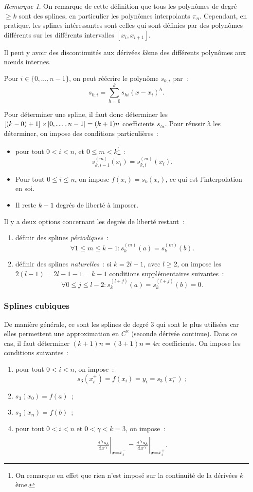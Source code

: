\documentclass{article}
\theoremstyle{definition}
\theoremstyle{remark}
\newtheorem*{rmq}{Remarque}
\begin{document}
		\begin{rmq} On remarque de cette définition que tous les polynômes de degré $\geq k$ sont des splines, en particulier les polynômes interpolants $\pi_n$.
		Cependant, en pratique, les splines intéressantes sont celles qui sont définies par des polynômes différents sur les différents intervalles
		$[x_i, x_{i+1}]$.

		Il peut y avoir des discontinuités aux dérivées $k$ème des différents polynômes aux nœuds internes.
		\end{rmq}

		Pour $i \in \{0, \dotsc, n-1\}$, on peut réécrire le polynôme $s_{k,i}$ par~:
		\[s_{k, i} = \sum_{h=0}^ks_{hi}(x-x_i)^h.\]

		Pour déterminer une spline, il faut donc déterminer les $[(k-0)+1] \times \abs{0, \dotsc, n-1} = (k+1)n$ coefficients $s_{hi}$. Pour réussir à les
		déterminer, on impose des conditions particulières~:
		\begin{itemize}
			\item pour tout $0 < i < n$, et $0 \leq m < k$\footnote{On remarque en effet que rien n'est imposé sur la continuité de la dérivées $k$ème.}~:
				\[s_{k, i-1}^{(m)}(x_i) = s_{k,i}^{(m)}(x_i).\]
			\item Pour tout $0 \leq i \leq n$, on impose $f(x_i) = s_k(x_i)$, ce qui est l'interpolation en soi.
			\item Il reste $k-1$ degrés de liberté à imposer.
		\end{itemize}

		Il y a deux options concernant les degrés de liberté restant~:
		\begin{enumerate}
			\item définir des splines \emph{périodiques}~:
				\[\forall 1 \leq m \leq k-1 : s_k^{(m)}(a) = s_k^{(m)}(b).\]
			\item définir des splines \emph{naturelles}~: si $k = 2l-1$, avec $l \geq 2$, on impose les $2(l-1) = 2l-1 -1 = k-1$ conditions supplémentaires
				suivantes~:
				\[\forall 0 \leq j \leq l-2 : s_k^{(l+j)}(a) = s_k^{(l+j)}(b) = 0.\]
		\end{enumerate}

		\subsubsection{Splines cubiques}
		De manière générale, ce sont les splines de degré 3 qui sont le plus utilisées car elles permettent une approximation en $C^2$ (seconde dérivée
		continue). Dans ce cas, il faut déterminer $(k+1)n = (3+1)n = 4n$ coefficients. On impose les conditions suivantes~:
		\begin{enumerate}
			\item pour tout $0 < i < n$, on impose~:
				\[s_3(x_i^+) = f(x_i) = y_i = s_3(x_i^-)~;\]
			\item $s_3(x_0) = f(a)$~;
			\item $s_3(x_n) = f(b)$~;
			\item pour tout $0 < i < n$ et $0 < \gamma < k = 3$, on impose~:
				\[\od[\gamma] {s_3}x\bigg\rvert_{x=x_i^-} = \od[\gamma] {s_3}x\bigg\rvert_{x=x_i^+}.\]
		\end{enumerate}
\end{document}

